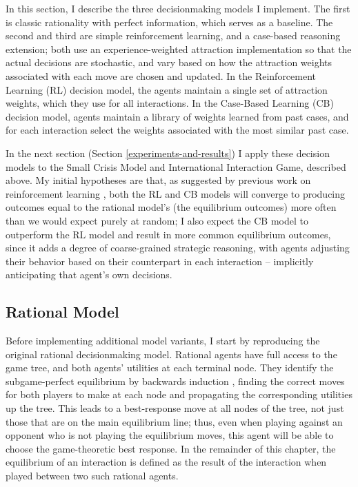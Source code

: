 In this section, I describe the three decisionmaking models I implement. The first is classic rationality with perfect information, which serves as a baseline. The second and third are simple reinforcement learning, and a case-based reasoning extension; both use an experience-weighted attraction implementation so that the actual decisions are stochastic, and vary based on how the attraction weights associated with each move are chosen and updated. In the Reinforcement Learning (RL) decision model, the agents maintain a single set of attraction weights, which they use for all interactions. In the Case-Based Learning (CB) decision model, agents maintain a library of weights learned from past cases, and for each interaction select the weights associated with the most similar past case.

In the next section (Section \ref{experiments-and-results}) I apply these decision models to the Small Crisis Model and International Interaction Game, described above. My initial hypotheses are that, as suggested by previous work on reinforcement learning \citep[e.g.][]{laslier_2005,akramizadeh_2009,galla_2013}, both the RL and CB models will converge to producing outcomes equal to the rational model's (the equilibrium outcomes) more often than we would expect purely at random; I also expect the CB model to outperform the RL model and result in more common equilibrium outcomes, since it adds a degree of coarse-grained strategic reasoning, with agents adjusting their behavior based on their counterpart in each interaction -- implicitly anticipating that agent's own decisions.

\subsection{Rational Model}\label{original-spe-model}

Before implementing additional model variants, I start by reproducing the original rational decisionmaking model. Rational agents have full access to the game tree, and both agents' utilities at each terminal node. They identify the subgame-perfect equilibrium by backwards induction \citep{russell_2009}, finding the correct moves for both players to make at each node and propagating the corresponding utilities up the tree. This leads to a best-response move at all nodes of the tree, not just those that are on the main equilibrium line; thus, even when playing against an opponent who is not playing the equilibrium moves, this agent will be able to choose the game-theoretic best response. In the remainder of this chapter, the equilibrium of an interaction is defined as the result of the interaction when played between two such rational agents.

